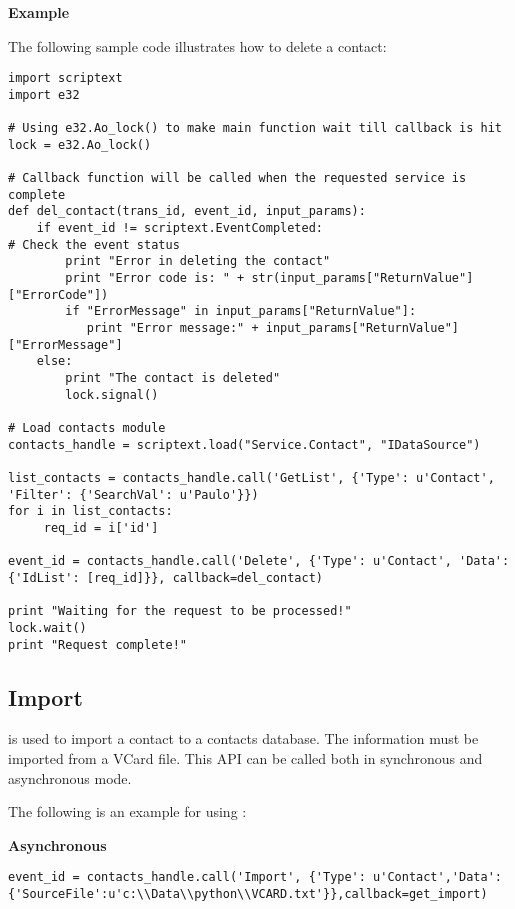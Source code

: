 {\bf Example} \break

The following sample code illustrates how to delete a contact:

\begin{verbatim}
import scriptext
import e32

# Using e32.Ao_lock() to make main function wait till callback is hit
lock = e32.Ao_lock()

# Callback function will be called when the requested service is complete
def del_contact(trans_id, event_id, input_params):
    if event_id != scriptext.EventCompleted:   
# Check the event status
        print "Error in deleting the contact"
        print "Error code is: " + str(input_params["ReturnValue"]["ErrorCode"])
        if "ErrorMessage" in input_params["ReturnValue"]:
           print "Error message:" + input_params["ReturnValue"]["ErrorMessage"]
    else:
        print "The contact is deleted"
        lock.signal()

# Load contacts module
contacts_handle = scriptext.load("Service.Contact", "IDataSource")

list_contacts = contacts_handle.call('GetList', {'Type': u'Contact', 'Filter': {'SearchVal': u'Paulo'}})
for i in list_contacts:
     req_id = i['id']

event_id = contacts_handle.call('Delete', {'Type': u'Contact', 'Data':{'IdList': [req_id]}}, callback=del_contact)

print "Waiting for the request to be processed!"
lock.wait()
print "Request complete!"
\end{verbatim}

\subsection{Import}
\label{subsec:contactimport}

 is used to import a contact to a contacts database. The information must be imported from a VCard file. This API can be called both in synchronous and asynchronous mode.

The following is an example for using :

{\bf Asynchronous} \break

\begin{verbatim}
event_id = contacts_handle.call('Import', {'Type': u'Contact','Data':{'SourceFile':u'c:\\Data\\python\\VCARD.txt'}},callback=get_import)
\end{verbatim}


